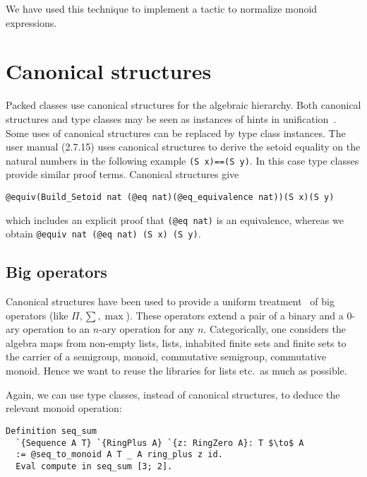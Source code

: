 \documentclass[a4paper,10pt,runningheads]{llncs}
\begin{document}
We have used this technique to implement a tactic to normalize monoid expressions.

\section{Canonical structures}\label{canonical}
Packed classes use canonical structures for the algebraic hierarchy. Both canonical structures and
type classes may be seen as instances of hints in unification~\cite{Hints}. Some uses of canonical
structures can be replaced by type class instances. The user manual (2.7.15) uses canonical
structures to derive the setoid equality on the natural
numbers in the following example \lstinline|(S x)==(S y)|. In this case type classes provide similar proof
terms. Canonical structures give
\begin{lstlisting}
@equiv(Build_Setoid nat (@eq nat)(@eq_equivalence nat))(S x)(S y)
\end{lstlisting}

which includes an explicit proof that \lstinline|(@eq nat)| is an equivalence,
whereas we obtain \lstinline|@equiv nat (@eq nat) (S x) (S y)|.

\subsection{Big operators}
Canonical structures have been used to provide a uniform treatment~\cite{bertot2008canonical} of big
operators (like $\Pi,\sum, \max$). These operators extend a pair of a binary and a 0-ary operation
to an $n$-ary operation for any $n$. Categorically, one considers the algebra maps from non-empty
lists, lists, inhabited finite sets and finite sets to the carrier of a semigroup, monoid,
commutative semigroup, commutative monoid. Hence we want to reuse the libraries for lists etc.\ as much as possible.

Again, we can use type classes, instead of canonical structures, to deduce the relevant monoid operation:
\begin{lstlisting}
Definition seq_sum
  `{Sequence A T} `{RingPlus A} `{z: RingZero A}: T $\to$ A
  := @seq_to_monoid A T _ A ring_plus z id.
  Eval compute in seq_sum [3; 2].
\end{lstlisting}
\end{document}
